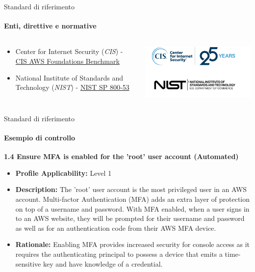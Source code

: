 \documentclass{beamer}
\newcommand{\hrefcol}[2]{\textcolor{cyan}{\href{#1}{#2}}}
\begin{document}
\begin{frame}{Standard di riferimento}
    \framesubtitle{Enti, direttive e normative}
    \begin{columns}
    \begin{column}{0.6\textwidth}
        \begin{itemize}
            \item Center for Internet Security (\emph{CIS}) -
                \hrefcol{https://www.cisecurity.org/}{CIS AWS Foundations Benchmark}
            \item National Institute of Standards and Technology (\emph{NIST}) - 
                \hrefcol{https://www.nist.gov/}{NIST SP 800-53}
        \end{itemize}
    \end{column}
    \begin{column}{0.4\textwidth}
    \includegraphics[width=\textwidth]{assets/cisnist.png}
    \end{column}
    \end{columns}
\end{frame}

\begin{frame}{Standard di riferimento}
    \framesubtitle{Esempio di controllo}
    \begin{mdframed}[backgroundcolor=statalegrey]
    \textbf{1.4 Ensure MFA is enabled for the 'root' user account (Automated)}
    \begin{itemize}
        \item \textbf{Profile Applicability:} Level 1
        \item \textbf{Description:} The 'root' user account is the most privileged user in an AWS account. Multi-factor Authentication (MFA) adds an extra layer of protection on top of a username and password. With MFA enabled, when a user signs in to an AWS website, they will be prompted for their username and password as well as for an authentication code from their AWS MFA device.
        \item \textbf{Rationale:} Enabling MFA provides increased security for console access as it requires the authenticating principal to possess a device that emits a time-sensitive key and have knowledge of a credential.
    \end{itemize} 
\end{mdframed}
\end{frame}
\end{document}
